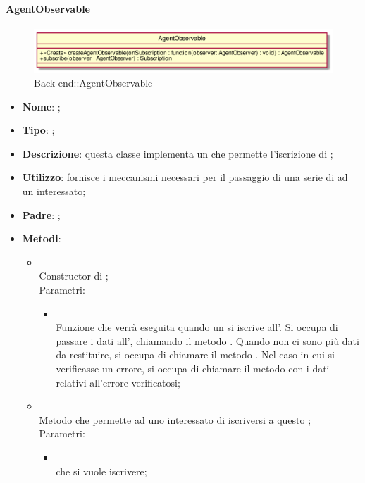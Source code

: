 \hypertarget{AgentObservable_label}{\paragraph{AgentObservable}}
\begin{figure}[h]
	\centering
	\includegraphics[width=\textwidth,height=\textheight,keepaspectratio]{images/ClassAgentObservable.png}
	\caption{Back-end::AgentObservable}
\end{figure}
\begin{itemize}
	\item \textbf{Nome}: ;
	\item \textbf{Tipo}: ;
	\item \textbf{Descrizione}: questa classe implementa un  che permette l'iscrizione di ;
	\item \textbf{Utilizzo}: fornisce i meccanismi necessari per il passaggio di una serie di  ad un  interessato;
	\item \textbf{Padre}: ;
	\item \textbf{Metodi}:
	\begin{itemize}
		\item[]  \\
		Constructor di ;\\
		Parametri:
		\begin{itemize}
			\item {} \\
			Funzione che verrà eseguita quando un  si iscrive all'. Si occupa di passare i dati all', chiamando il metodo . Quando non ci sono più dati da restituire, si occupa di chiamare il metodo . Nel caso in cui si verificasse un errore, si occupa di chiamare il metodo  con i dati relativi all'errore verificatosi;
		\end{itemize}
		\item[]  \\
		Metodo che permette ad uno  interessato di iscriversi a questo ;\\
		Parametri:
		\begin{itemize}
			\item {} \\
			 che si vuole iscrivere;
		\end{itemize}
	\end{itemize}
\end{itemize}

